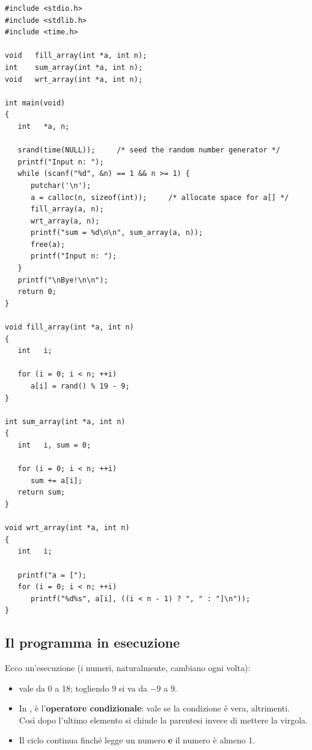 \begin{lstlisting}[style=c, name=dinamico.c]
#include <stdio.h>
#include <stdlib.h>
#include <time.h>

void   fill_array(int *a, int n);
int    sum_array(int *a, int n);
void   wrt_array(int *a, int n);

int main(void)
{
   int   *a, n;

   srand(time(NULL));     /* seed the random number generator */
   printf("Input n: ");
   while (scanf("%d", &n) == 1 && n >= 1) {
      putchar('\n');
      a = calloc(n, sizeof(int));     /* allocate space for a[] */
      fill_array(a, n);
      wrt_array(a, n);
      printf("sum = %d\n\n", sum_array(a, n));
      free(a);
      printf("Input n: ");
   }
   printf("\nBye!\n\n");
   return 0;
}

void fill_array(int *a, int n)
{
   int   i;

   for (i = 0; i < n; ++i)
      a[i] = rand() % 19 - 9;
}

int sum_array(int *a, int n)
{
   int   i, sum = 0;

   for (i = 0; i < n; ++i)
      sum += a[i];
   return sum;
}

void wrt_array(int *a, int n)
{
   int   i;

   printf("a = [");
   for (i = 0; i < n; ++i)
      printf("%d%s", a[i], ((i < n - 1) ? ", " : "]\n"));
}
\end{lstlisting}

\subsection{Il programma in esecuzione}

Ecco un'esecuzione (i numeri, naturalmente, cambiano ogni volta):

\begin{affianco}[0.42][c]
\risultato
\begin{itemize}
  \item {} vale da 0 a 18; togliendo 9 si va da $-9$ a 9.
  \item In , \code{(i < n - 1) ? ", " : "]\textbackslash
        n"} è l'\textbf{operatore condizionale}: vale  se la
        condizione è vera, \code{"]\textbackslash n"} altrimenti. Così dopo
        l'ultimo elemento si chiude la parentesi invece di mettere la
        virgola.
  \item Il ciclo continua finché  legge un numero
        \textbf{e} il numero è almeno 1.
\end{itemize}
\end{affianco}

